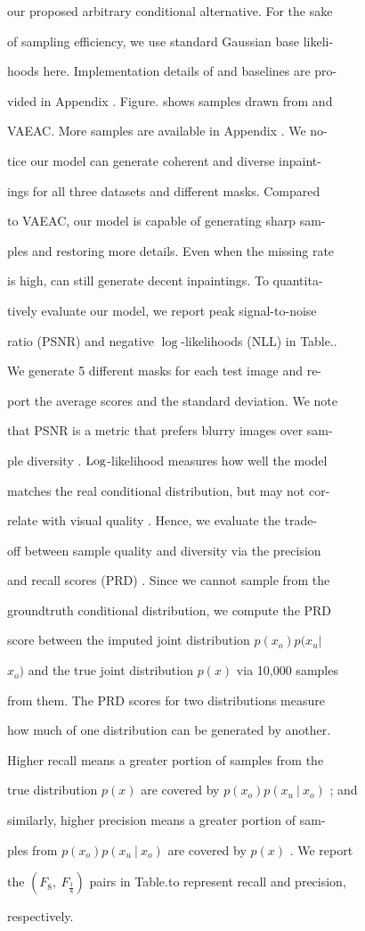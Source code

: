 \documentclass[a4paper,12pt]{article}
\begin{document}
our proposed arbitrary conditional alternative. For the sake

of sampling efficiency, we use standard Gaussian base likeli-

hoods here. Implementation details of and baselines are pro-

vided in Appendix . Figure. shows samples drawn from and

VAEAC. More samples are available in Appendix . We no-

tice our model can generate coherent and diverse inpaint-

ings for all three datasets and different masks. Compared

to VAEAC, our model is capable of generating sharp sam-

ples and restoring more details. Even when the missing rate

is high, can still generate decent inpaintings. To quantita-

tively evaluate our model, we report peak signal-to-noise

ratio (PSNR) and negative $\log$-likelihoods (NLL) in Table..

We generate 5 different masks for each test image and re-

port the average scores and the standard deviation. We note

that PSNR is a metric that prefers blurry images over sam-

ple diversity . ${\rm Log}$-likelihood measures how well the model

matches the real conditional distribution, but may not cor-

relate with visual quality . Hence, we evaluate the trade-

off between sample quality and diversity via the precision

and recall scores (PRD) . Since we cannot sample from the

groundtruth conditional distribution, we compute the PRD

score between the imputed joint distribution $p(x_{o})p(x_{u} |$

$x_{o})$ and the true joint distribution $p(x)$ via 10,000 samples

from them. The PRD scores for two distributions measure

how much of one distribution can be generated by another.

Higher recall means a greater portion of samples from the

true distribution $p(x)$ are covered by $p(x_{o})p(x_{u}\ |\ x_{o})$ ; and

similarly, higher precision means a greater portion of sam-

ples from $p(x_{o})p(x_{u}\ |\ x_{o})$ are covered by $p(x)$ . We report

the $(F_{8},\ F_{\frac{1}{8}})$ pairs in Table.to represent recall and precision,

respectively.
\end{document}
